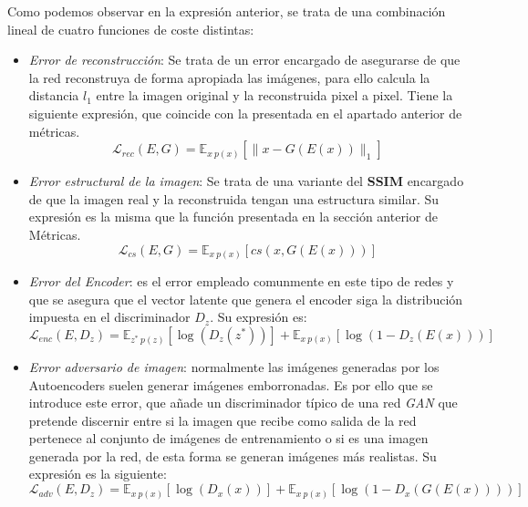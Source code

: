             \medskip

            \noindent Como podemos observar en la expresión anterior, se trata de una combinación lineal de cuatro funciones de coste distintas: 

            \begin{itemize}
                \item \textit{Error de reconstrucción}: Se trata de un error encargado de asegurarse de que la red reconstruya de forma apropiada las imágenes, para ello calcula la distancia $l_1$ entre la imagen original y la reconstruida pixel a pixel. Tiene la siguiente expresión, que coincide con la presentada en el apartado anterior de métricas.
                \begin{equation}
                    \mathcal{L}_{rec}(E,G)= \mathbb{E}_{x~p(x)}\left[\|x- G(E(x)) \|_1\right]
                \end{equation}
                \item \textit{Error estructural de la imagen}: Se trata de una variante del \textbf{SSIM} encargado de que la imagen real y la reconstruida tengan una estructura similar. Su expresión es la misma que la función presentada en la sección anterior de Métricas.
                \begin{equation}
                    \mathcal{L}_{cs}(E,G)= \mathbb{E}_{x~p(x)}\left[cs(x, G(E(x)))\right]
                \end{equation}
                \item \textit{Error del Encoder}: es el error empleado comunmente en este tipo de redes y que se asegura que el vector latente que genera el encoder siga la distribución impuesta en el discriminador $D_z$. Su expresión es:
                \begin{equation}
                    \mathcal{L}_{enc}(E,D_z)=\mathbb{E}_{z^*~p(z)}[\log(D_z(z^*))] + \mathbb{E}_{x~p(x)}[\log(1-D_z(E(x)))]
                \end{equation}
                \item \textit{Error adversario de imagen}: normalmente las imágenes generadas por los Autoencoders suelen generar imágenes emborronadas. Es por ello que se introduce este error, que añade un discriminador típico de una red \textit{GAN} que pretende discernir entre si la imagen que recibe como salida de la red pertenece al conjunto de imágenes de entrenamiento o si es una imagen generada por la red, de esta forma se generan imágenes más realistas. Su expresión es la siguiente: 
                \begin{equation}
                    \mathcal{L}_{adv}(E,D_z)=\mathbb{E}_{x~p(x)}[\log(D_x(x))] + \mathbb{E}_{x~p(x)}[\log(1-D_x(G(E(x))))]
                \end{equation}
            \end{itemize}

